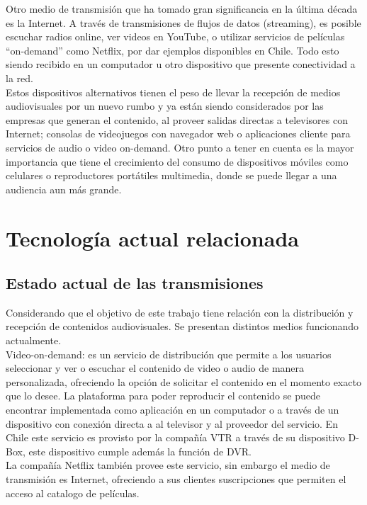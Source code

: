 Otro medio de transmisión que ha tomado gran significancia en la última década es la Internet. A través de transmisiones de flujos de datos (streaming), es posible escuchar radios online, ver videos en YouTube, o utilizar servicios de películas “on-demand” como Netflix, por dar ejemplos disponibles en Chile. Todo esto siendo recibido en un computador u otro dispositivo que presente conectividad a la red.\\

Estos dispositivos alternativos tienen el peso de llevar la recepción de medios audiovisuales por un nuevo rumbo y ya están siendo considerados por las empresas que generan el contenido, al proveer salidas directas a televisores con Internet; consolas de videojuegos con navegador web o aplicaciones cliente para servicios de audio o video on-demand. Otro punto a tener en cuenta es la mayor importancia que tiene el crecimiento del consumo de dispositivos móviles como celulares o reproductores portátiles multimedia, donde se puede llegar a una audiencia aun más grande.\\

\clearpage
\section{Tecnología actual relacionada}

\subsection{Estado actual de las transmisiones}

Considerando que el objetivo de este trabajo tiene relación con la distribución y recepción de contenidos audiovisuales. Se presentan distintos medios funcionando actualmente.\\

Video-on-demand: es un servicio de distribución que permite a los usuarios seleccionar y ver o escuchar el contenido de video o audio de manera personalizada, ofreciendo la opción de solicitar el contenido en el momento exacto que lo desee.  La plataforma para poder reproducir el contenido se puede encontrar implementada como aplicación en un computador o a través de un dispositivo con conexión directa a al televisor y al proveedor del servicio. En Chile este servicio es provisto por la compañía VTR a través de su dispositivo D-Box, este dispositivo cumple además la función de DVR.\\

La compañía Netflix también provee este servicio, sin embargo el medio de transmisión es Internet, ofreciendo a sus clientes suscripciones que permiten el acceso al catalogo de películas.\\

